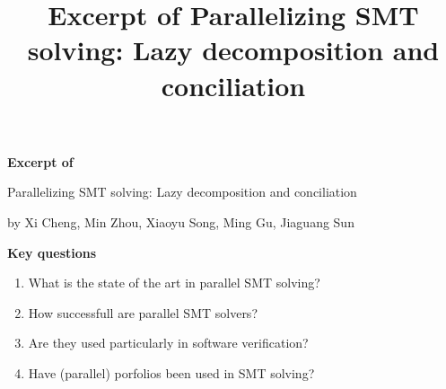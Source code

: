 \documentclass{scrartcl}
\title{Excerpt of Parallelizing SMT solving: Lazy decomposition and conciliation}
\begin{document}
\begin{center}
    \Large{\textbf{Excerpt of}}

    \LARGE{Parallelizing SMT solving: Lazy decomposition and conciliation}

    \large{by Xi Cheng, Min Zhou, Xiaoyu Song, Ming Gu, Jiaguang Sun}
\end{center}

\vspace{1cm}

\begin{addmargin}[0.2\linewidth]{0.2\linewidth}
    \begin{center}
        \textbf{Key questions}
    \end{center}
    \begin{enumerate}[i]
        \item What is the state of the art in parallel SMT solving?
        \item How successfull are parallel SMT solvers?
        \item Are they used particularly in software verification?
        \item Have (parallel) porfolios been used in SMT solving?
    \end{enumerate}
\end{addmargin}

\vspace{1cm}
\end{document}
